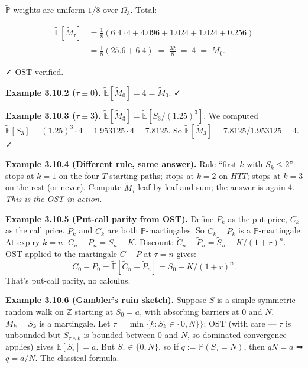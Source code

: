 \documentclass[
  10pt,
  twoside]{book}
\begin{document}
\(\tilde{\mathbb P}\)-weights are uniform \(1/8\) over \(\Omega_3\).
Total:

\[
\begin{aligned}
\tilde{\mathbb E}[\widetilde M_\tau]
&= \tfrac{1}{8}(6.4 \cdot 4 + 4.096 + 1.024 + 1.024 + 0.256) \\
&= \tfrac{1}{8}(25.6 + 6.4) \;=\; \tfrac{32}{8} \;=\; 4 \;=\; \widetilde M_0.
\end{aligned}
\]

✓ OST verified.

\textbf{Example 3.10.2 (\(\tau \equiv 0\)).}
\(\tilde{\mathbb E}[\widetilde M_0] = 4 = \widetilde M_0\). ✓

\textbf{Example 3.10.3 (\(\tau \equiv 3\)).}
\(\tilde{\mathbb E}[\widetilde M_3] = \tilde{\mathbb E}[S_3/(1.25)^3]\).
We computed
\(\tilde{\mathbb E}[S_3] = (1.25)^3 \cdot 4 = 1.953125 \cdot 4 = 7.8125\).
So \(\tilde{\mathbb E}[\widetilde M_3] = 7.8125 / 1.953125 = 4\). ✓

\textbf{Example 3.10.4 (Different rule, same answer).} Rule ``first
\(k\) with \(S_k \le 2\)'': stops at \(k=1\) on the four \(T\)-starting
paths; stops at \(k=2\) on \(HTT\); stops at \(k=3\) on the rest (or
never). Compute \(\widetilde M_\tau\) leaf-by-leaf and sum; the answer
is again 4. \emph{This is the OST in action.}

\textbf{Example 3.10.5 (Put-call parity from OST).} Define \(P_k\) as
the put price, \(C_k\) as the call price. \(\widetilde P_k\) and
\(\widetilde C_k\) are both \(\tilde{\mathbb P}\)-martingales. So
\(\widetilde C_k - \widetilde P_k\) is a
\(\tilde{\mathbb P}\)-martingale. At expiry \(k=n\):
\(C_n - P_n = S_n - K\). Discount:
\(\widetilde C_n - \widetilde P_n = \widetilde S_n - K/(1+r)^n\). OST
applied to the martingale \(\widetilde C - \widetilde P\) at
\(\tau = n\) gives:
\[C_0 - P_0 = \tilde{\mathbb E}[\widetilde C_n - \widetilde P_n] = S_0 - K/(1+r)^n.\]
That's put-call parity, no calculus.

\textbf{Example 3.10.6 (Gambler's ruin sketch).} Suppose \(S\) is a
simple symmetric random walk on \(\mathbb Z\) starting at \(S_0 = a\),
with absorbing barriers at \(0\) and \(N\). \(M_k = S_k\) is a
martingale. Let \(\tau = \min\{k : S_k \in \{0, N\}\}\); OST (with care
--- \(\tau\) is unbounded but \(S_{\tau \wedge k}\) is bounded between
\(0\) and \(N\), so dominated convergence applies) gives
\(\mathbb E[S_\tau] = a\). But \(S_\tau \in \{0, N\}\), so if
\(q := \mathbb P(S_\tau = N)\), then \(qN = a\) ⇒ \(q = a/N\). The
classical formula.
\end{document}
